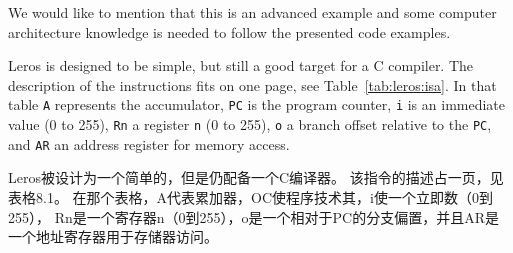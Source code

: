 \documentclass[%
    10pt,
    headinclude, footexclude,
    openright, %
    notitlepage,
    cleardoubleempty,
    headsepline,
    pointlessnumbers,
    bibtotoc, idxtotoc,
    ]{scrbook}
\newcommand{\code}[1]{{\small{\texttt{#1}}}}
\begin{document}
We would like to mention that this is an advanced example and some computer
architecture knowledge is needed to follow the presented code examples.

Leros is designed to be simple, but still a good target for a C compiler.
The description of the instructions fits on one page, see Table~\ref{tab:leros:isa}.
In that table \code{A} represents the accumulator, \code{PC} is the program counter,
\code{i} is an immediate value (0 to 255), \code{Rn} a register
\code{n} (0 to 255), \code{o} a branch offset relative to the \code{PC},
and \code{AR} an address register for memory access.

Leros被设计为一个简单的，但是仍配备一个C编译器。
该指令的描述占一页，见表格8.1。
在那个表格，A代表累加器，OC使程序技术其，i使一个立即数（0到255）， Rn是一个寄存器n（0到255），o是一个相对于PC的分支偏置，并且AR是一个地址寄存器用于存储器访问。
\end{document}
